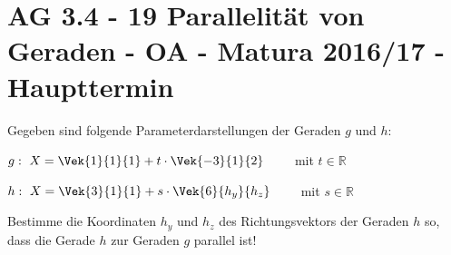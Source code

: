 \section{AG 3.4 - 19 Parallelität von Geraden - OA - Matura 2016/17 - Haupttermin}

\begin{beispiel}[AG 3.4]{1} %
Gegeben sind folgende Parameterdarstellungen der Geraden $g$ und $h$:\leer

$g:~ X=\Vek{1}{1}{1}+t\cdot \Vek{-3}{1}{2} \qquad$ mit $t\in \mathbb{R}$

$h:~ X=\Vek{3}{1}{1}+s\cdot \Vek{6}{h_y}{h_z} \qquad$ mit $s\in \mathbb{R}$ \leer

Bestimme die Koordinaten $h_y$ und $h_z$ des Richtungsvektors der Geraden $h$ so, dass die
Gerade $h$ zur Geraden $g$ parallel ist!


\end{beispiel}